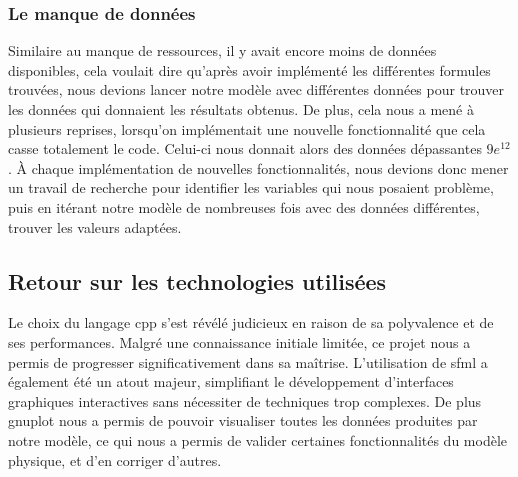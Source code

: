 \subsubsection{Le manque de données}\label{subsubsec:manque-data}
Similaire au manque de ressources, il y avait encore moins de données disponibles, cela voulait dire qu'après avoir implémenté les différentes formules trouvées, nous devions lancer notre modèle avec différentes données pour trouver les données qui donnaient les résultats obtenus.
De plus, cela nous a mené à plusieurs reprises, lorsqu'on implémentait une nouvelle fonctionnalité que cela casse totalement le code.
Celui-ci nous donnait alors des données dépassantes $9e^{12}$.
À chaque implémentation de nouvelles fonctionnalités, nous devions donc mener un travail de recherche pour identifier les variables qui nous posaient problème, puis en itérant notre modèle de nombreuses fois avec des données différentes, trouver les valeurs adaptées.

\subsection{Retour sur les technologies utilisées}\label{subsec:retour-sur-les-technologies-utilisees}
Le choix du langage \gls{cpp} s'est révélé judicieux en raison de sa polyvalence et de ses performances.
Malgré une connaissance initiale limitée, ce projet nous a permis de progresser significativement dans sa maîtrise.
L'utilisation de \gls{sfml} a également été un atout majeur, simplifiant le développement d'interfaces graphiques interactives sans nécessiter de techniques trop complexes.
De plus \gls{gnuplot} nous a permis de pouvoir visualiser toutes les données produites par notre modèle, ce qui nous a permis de valider certaines fonctionnalités du modèle physique, et d'en corriger d'autres.






